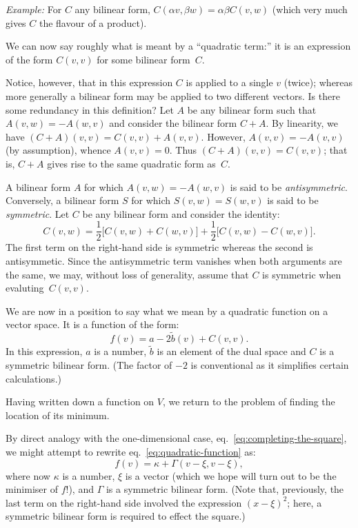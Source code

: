 \documentclass[10pt, a4paper]{article}
\newcommand{\eg}{\emph{Example:}}
\begin{document}
\eg{} For $C$ any bilinear form,
$C(\alpha v, \beta w) = \alpha\beta C(v,w)$ (which very much gives $C$ the flavour of a
product).

We can now say roughly what is meant by a “quadratic term:” it is an
expression of the form $C(v,v)$ for some bilinear form~$C$.

Notice, however, that in this expression $C$ is applied to a single
$v$ (twice); whereas more generally a bilinear form may be applied to
two different vectors. Is there some redundancy in this definition?
Let $A$ be any bilinear form such that $A(v,w)=-A(w,v)$ and consider
the bilinear form $C+A$. By linearity, we have $(C+A)(v, v) =
C(v,v)+A(v,v)$. However, $A(v,v)=-A(v,v)$ (by assumption), whence
$A(v,v)=0$. Thus $(C+A)(v,v)=C(v,v)$; that is, $C+A$ gives rise to the
same quadratic form as~$C$.

A bilinear form $A$ for which $A(v,w)=-A(w,v)$ is said to be
\emph{antisymmetric}. Conversely, a bilinear form $S$ for which
$S(v,w)=S(w,v)$ is said to be \emph{symmetric}. Let $C$ be any
bilinear form and consider the identity:
\[
  C(v, w) = \frac{1}{2}\bigl[C(v,w) + C(w,v)\bigr]
  + \frac{1}{2}\bigl[C(v,w) - C(w,v)\bigr].
\]
The first term on the right-hand side is symmetric whereas the second
is antisymmetic. Since the antisymmetric term vanishes when both
arguments are the same, we may, without loss of generality, assume
that $C$ is symmetric when evaluting~$C(v,v)$.

We are now in a position to say what we mean by a quadratic function on
a vector space. It is a function of the form:
\begin{equation}
  f(v) = a - 2\tilde{b}(v) + C(v, v).
  \label{eq:quadratic-function}
\end{equation}
In this expression, $a$ is a number, $\tilde{b}$ is an element of the
dual space and $C$ is a symmetric bilinear form. (The factor of $-2$
is conventional as it simplifies certain calculations.)

Having written down a function on $V$, we return to the problem of
finding the location of its minimum.

By direct analogy with the one-dimensional case,
eq.~\eqref{eq:completing-the-square}, we might attempt to rewrite
eq.~\eqref{eq:quadratic-function} as:
\begin{equation}
  f(v) = \kappa + \Gamma(v - \xi, v - \xi),
  \label{eq:vector-square}
\end{equation}
where now $\kappa$ is a number, $\xi$ is a vector (which we hope will turn
out to be the minimiser of $f$!), and $\Gamma$ is a symmetric bilinear
form. (Note that, previously, the last term on the right-hand side
involved the expression ${(x-\xi)}^2$; here, a symmetric bilinear form
is required to effect the square.)
\end{document}
